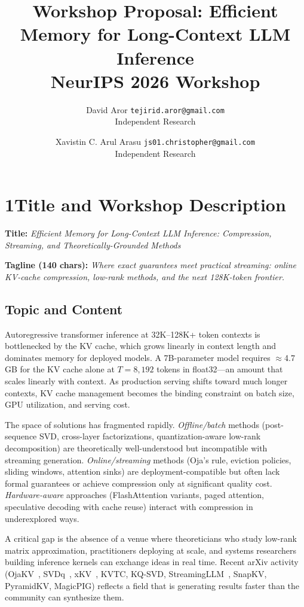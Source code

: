 \documentclass{article}
\title{\textbf{Workshop Proposal: Efficient Memory for Long-Context LLM Inference}\\
\large NeurIPS 2026 Workshop}
\author{
  David Aror \quad \texttt{tejirid.aror@gmail.com}\\
  Independent Research
  \and
  Xavistin C. Arul Arasu \quad \texttt{js01.christopher@gmail.com}\\
  Independent Research
}
\date{}
\begin{document}
\maketitle


\section*{1\quad Title and Workshop Description}

\textbf{Title:} \emph{Efficient Memory for Long-Context LLM Inference: Compression, Streaming, and Theoretically-Grounded Methods}

\textbf{Tagline (140 chars):}
\textit{Where exact guarantees meet practical streaming: online KV-cache compression, low-rank methods, and the next 128K-token frontier.}

\subsection*{Topic and Content}

Autoregressive transformer inference at 32K--128K+ token contexts is bottlenecked
by the KV cache, which grows linearly in context length and dominates memory for
deployed models.  A 7B-parameter model requires $\approx$4.7\,GB for the KV cache
alone at $T{=}8{,}192$ tokens in float32---an amount that scales linearly with
context.  As production serving shifts toward much longer contexts, KV cache
management becomes the binding constraint on batch size, GPU utilization, and
serving cost.

The space of solutions has fragmented rapidly.  \emph{Offline/batch} methods
(post-sequence SVD, cross-layer factorizations, quantization-aware low-rank
decomposition) are theoretically well-understood but incompatible with streaming
generation.  \emph{Online/streaming} methods (Oja's rule, eviction policies,
sliding windows, attention sinks) are deployment-compatible but often lack
formal guarantees or achieve compression only at significant quality cost.
\emph{Hardware-aware} approaches (FlashAttention variants, paged attention,
speculative decoding with cache reuse) interact with compression in
underexplored ways.

A critical gap is the absence of a venue where theoreticians who study
low-rank matrix approximation, practitioners deploying at scale, and
systems researchers building inference kernels can exchange ideas in real time.
Recent arXiv activity (OjaKV~\cite{ojakov2025}, SVDq~\cite{svdq2025},
xKV~\cite{xkv2025}, KVTC, KQ-SVD, StreamingLLM~\cite{streamingllm2023},
SnapKV, PyramidKV, MagicPIG) reflects a field that is generating results
faster than the community can synthesize them.
\end{document}
